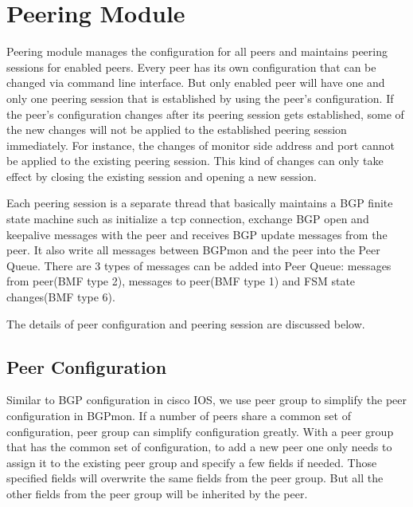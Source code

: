  \section{Peering Module}
\label{sec:peering}

Peering module manages the configuration for all peers and maintains peering sessions for enabled peers. Every peer has its own configuration that can be changed via command line interface. 
But only enabled peer will have one and only one peering session that is established by using the peer's configuration. If the peer's configuration changes after its peering session gets established, some of the new changes will not be applied to the established peering session immediately. For instance, the changes of monitor side address and port cannot be applied to the existing peering session. This kind of changes can only take effect by closing the existing session and opening a new session.

Each peering session is a separate thread that basically maintains a BGP finite state machine such as initialize a tcp connection, exchange BGP open and keepalive messages with the peer and receives BGP update messages from
the peer. It also write all messages between BGPmon and the peer into the Peer Queue. There are 3 types of messages can be added into Peer Queue: messages from peer(BMF type 2), messages to peer(BMF type 1) and FSM state changes(BMF type 6).     
 
The details of peer configuration and peering session are discussed below. 


\subsection{Peer Configuration}
Similar to BGP configuration in cisco IOS, we use peer group to simplify the peer configuration in BGPmon. If a number of peers share a common set of configuration, peer group can simplify configuration greatly. With a peer group that has the common set of configuration, to add a new peer one only needs to assign it to the existing peer group and specify a few fields if needed. Those specified fields will overwrite the same fields from the peer group. But all the other fields from the peer group will be inherited by the peer. 

